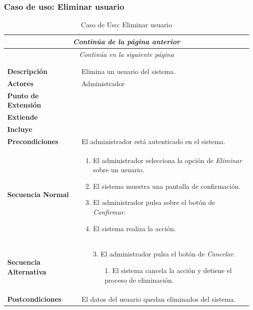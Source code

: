 \subsubsection*{Caso de uso: Eliminar usuario }
\begin{longtable}{| p{4cm} | p{10cm} |}
\endfirsthead
\multicolumn{2}{c}{\textit{Continúa de la página anterior}}\\[12pt]
\hline
\endhead
\hline
\multicolumn{2}{c}{\textit{Continúa en la siguiente página}} \\
\endfoot
\hline
\caption{Caso de Uso: Eliminar usuario}\label{fig:1}\\
\endlastfoot


\hline
\multicolumn{2}{|c|}{\textbf{CU$<$26$>$ - Eliminar Usuario}} \\

\hline
\textbf{Descripción} &
Elimina un usuario del sistema.\\

\hline
\textbf{Actores} &
Administrador\\

\hline
\textbf{Punto de Extensión} &
\\

\hline
\textbf{Extiende} &
\\

\hline
\textbf{Incluye} &
\\

\hline
\textbf{Precondiciones} &
El administrador está autenticado en el sistema.\\

\hline
\textbf{Secuencia Normal} &\mbox{}\par\vspace{-\baselineskip}
\begin{enumerate}[leftmargin=0.7cm, topsep=0.1cm]
\item El administrador selecciona la opción de \textit{Eliminar} sobre un usuario.
\item El sistema muestra una pantalla de confirmación.
\item El administrador pulsa sobre el botón de \textit{Confirmar}.
\item El sistema realiza la acción.
\end{enumerate}


\\
\hline
\textbf{Secuencia Alternativa} &\mbox{}\par\vspace{-\baselineskip}
\begin{enumerate}[leftmargin=0.9cm, topsep=0.1cm]
\item[3.] El administrador pulsa el botón de \textit{Cancelar}.
	\begin{itemize}
	\item[1.] El sistema cancela la acción y detiene el proceso de eliminación.
	\end{itemize}
\end{enumerate}
\\

\hline
\textbf{Postcondiciones} & 
El datos del usuario quedan eliminados del sistema.\\
\hline
\end{longtable}
